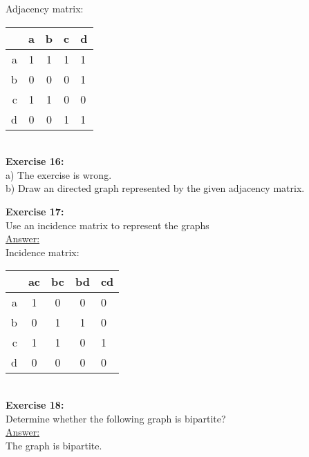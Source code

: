 \documentclass[10pt]{article}
\begin{document}
Adjacency matrix:\\
\begin{tabular}{|r|c|c|c|l|}
\hline
  &a & b& c& d\\
\hline
a&1 &1&1&1\\
\hline
b &0 & 0& 0& 1\\
\hline
c &1 & 1& 0& 0\\
\hline
d &0 & 0& 1& 1\\
\hline
\end{tabular}\\

	\textbf{Exercise 16:}\\
a) The exercise is wrong.\\
b) Draw an directed graph represented by the given adjacency matrix.\\
\bigbreak
	
	\textbf{Exercise 17:}\\
Use an incidence matrix to represent the graphs\\
\underline{Answer:}\\
Incidence matrix:\\
\begin{tabular}{|r|c|c|c|l|}
\hline
  &ac & bc& bd& cd\\
\hline
a&1 &0&0&0\\
\hline
b &0 & 1& 1& 0\\
\hline
c &1 & 1& 0& 1\\
\hline
d &0 & 0& 0& 0\\
\hline
\end{tabular}\\

	\textbf{Exercise 18:}\\
Determine whether the following graph is bipartite?\\
\underline{Answer:}\\
The graph is bipartite.\\
\end{document}
